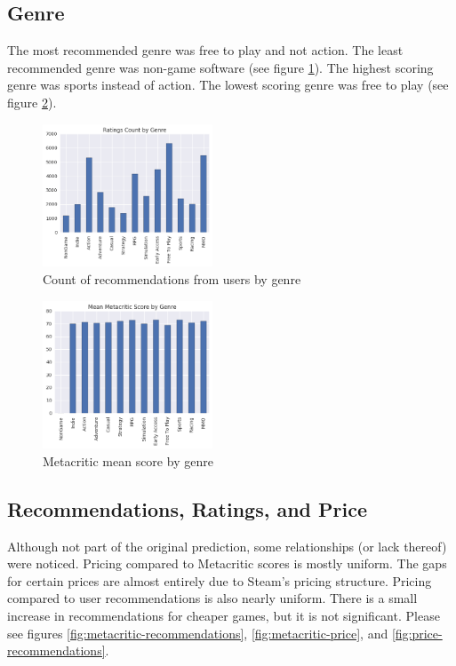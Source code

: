 \documentclass[letterpaper,10pt,twocolumn]{article}
\begin{document}
\subsection{Genre}

The most recommended genre was free to play and not action. The least
recommended genre was non-game software (see figure \ref{fig:genre-ratings}).
The highest scoring genre was sports instead of action. The lowest
scoring genre was free to play (see figure \ref{fig:genre-metacritic}).

\begin{figure}[h]
    \caption{Count of recommendations from users by genre}
    \label{fig:genre-ratings}
    \includegraphics[width=0.45\textwidth,keepaspectratio]{genre-ratings-bar}
\end{figure}

\begin{figure}[h]
    \caption{Metacritic mean score by genre}
    \label{fig:genre-metacritic}
    \includegraphics[width=0.45\textwidth,keepaspectratio]{genre-metacritic-bar}
\end{figure}

\subsection{Recommendations, Ratings, and Price}

Although not part of the original prediction, some relationships (or lack
thereof) were noticed. Pricing compared to Metacritic scores is mostly
uniform. The gaps for certain prices are almost entirely due to Steam's
pricing structure. Pricing compared to user recommendations is also nearly
uniform. There is a small increase in recommendations for cheaper games, but
it is not significant. Please see figures
\ref{fig:metacritic-recommendations},
\ref{fig:metacritic-price}, and
\ref{fig:price-recommendations}.
\end{document}
